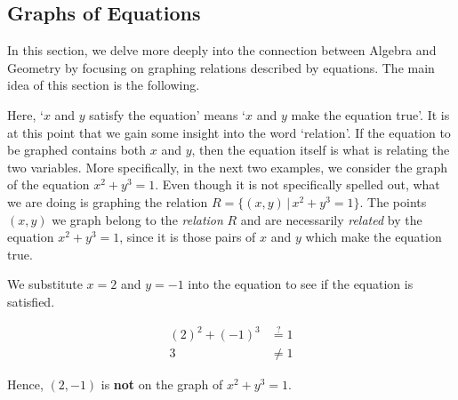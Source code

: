 \subsection{Graphs of Equations}

\label{GraphsofEquations}

In this section, we delve more deeply into the connection between Algebra and Geometry by focusing on graphing relations described by equations.  The main idea of this section is the following.

\smallskip


\smallskip

Here, `$x$ and $y$ satisfy the equation' means `$x$ and $y$ make the equation true'.  It is at this point that we gain some insight into the word `relation'.  If the equation to be graphed contains both $x$ and $y$, then the equation itself is what is relating the two variables.  More specifically, in the next two examples, we consider the  graph of the equation $x^2+y^3=1$. Even though it is not specifically spelled out, what we are doing is graphing the relation $R = \{ (x,y) \, | \, x^2+y^3 = 1\}$.  The points $(x,y)$ we graph belong to the \textit{relation} $R$ and are necessarily \textit{related} by the equation  $x^2+y^3 = 1$, since it is those pairs of $x$ and $y$ which make the equation true.

\medskip

{
We substitute $x=2$ and $y=-1$ into the equation to see if the equation is satisfied.

\begin{align*}
 (2)^2+(-1)^3 & \stackrel{?}{=}  1  \\ 
            3 & \neq  1 
\end{align*}

Hence, $(2,-1)$ is \textbf{not} on the graph of $x^2 + y^3 = 1$.  
}

\medskip

